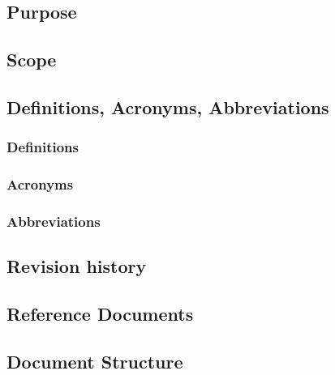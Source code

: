 \subsection{Purpose}

\subsection{Scope}

\subsection{Definitions, Acronyms, Abbreviations}

\subsubsection{Definitions}
\subsubsection{Acronyms}
\subsubsection{Abbreviations}

\subsection{Revision history}

\subsection{Reference Documents}

\subsection{Document Structure}